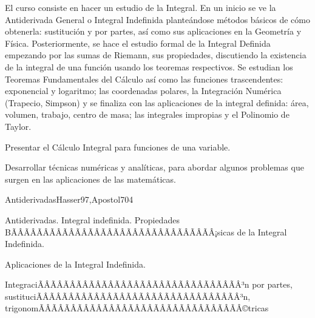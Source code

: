 \begin{sumilla}


\begin{fundamentacion}
El curso consiste en hacer un estudio de la Integral. En un inicio se ve la Antiderivada General o Integral Indefinida plante\'andose m\'etodos b\'asicos de c\'omo obtenerla: sustituci\'on y por partes, as\'i como sus aplicaciones en la Geometr\'ia y F\'isica. Posteriormente, se hace el estudio formal de la Integral Definida empezando por las sumas de Riemann, sus propiedades, discutiendo la existencia de la integral de una funci\'on usando los teoremas respectivos. Se estudian los Teoremas Fundamentales del C\'alculo as\'i como las funciones trascendentes: exponencial y logaritmo; las coordenadas polares, la Integraci\'on Num\'erica (Trapecio, Simpson) y se finaliza con las aplicaciones de la integral definida: \'area, volumen, trabajo, centro de masa; las integrales impropias y el Polinomio de Taylor.
\end{fundamentacion}

\begin{objetivosdelcurso}
\item Presentar el C\'alculo Integral para funciones de una variable.
\item Desarrollar t\'ecnicas num\'ericas y anal\'iticas, para abordar algunos problemas que surgen en las aplicaciones de las matem\'aticas.
\end{objetivosdelcurso}

\begin{outcomes}
\end{outcomes}

\begin{unit}{Antiderivadas}{Hasser97,Apostol70}{4}
\begin{topicos}
      \item Antiderivadas. Integral indefinida. Propiedades BÃÂÃÂÃÂÃÂÃÂÃÂÃÂÃÂÃÂÃÂÃÂÃÂÃÂÃÂÃÂÃÂ¡sicas de la  Integral Indefinida.
      \item Aplicaciones de la Integral Indefinida.
      \item IntegraciÃÂÃÂÃÂÃÂÃÂÃÂÃÂÃÂÃÂÃÂÃÂÃÂÃÂÃÂÃÂÃÂ³n por partes,  sustituciÃÂÃÂÃÂÃÂÃÂÃÂÃÂÃÂÃÂÃÂÃÂÃÂÃÂÃÂÃÂÃÂ³n, trigonomÃÂÃÂÃÂÃÂÃÂÃÂÃÂÃÂÃÂÃÂÃÂÃÂÃÂÃÂÃÂÃÂ©tricas
   \end{topicos}


\end{unit}
\end{sumilla}
